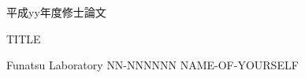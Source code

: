 
\begin{titlepage}
  \begin{center}

    {\huge 平成yy年度修士論文 \\ }

    {\huge TITLE}

    {\huge Funatsu Laboratory}
    {\huge NN-NNNNNN NAME-OF-YOURSELF}
  \end{center}
\end{titlepage}
